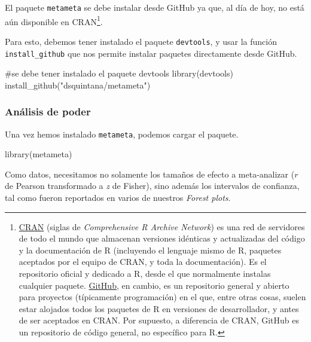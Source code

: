 \documentclass[
  bookmarksnumbered]{article}
\newenvironment{Shaded}{\begin{snugshade}}{\end{snugshade}}
\newcommand{\CommentTok}[1]{\textcolor[rgb]{0.54,0.53,0.53}{#1}}
\newcommand{\FunctionTok}[1]{\textcolor[rgb]{0.39,0.29,0.61}{#1}}
\newcommand{\NormalTok}[1]{\textcolor[rgb]{0.12,0.11,0.11}{#1}}
\newcommand{\StringTok}[1]{\textcolor[rgb]{0.75,0.01,0.01}{#1}}
\begin{document}
El paquete \texttt{metameta} se debe instalar desde GitHub ya que, al día de hoy, no está aún disponible en CRAN\footnote{\href{https://cran.r-project.org/}{CRAN} (siglas de \emph{Comprehensive R Archive Network}) es una red de servidores de todo el mundo que almacenan versiones idénticas y actualizadas del código y la documentación de R (incluyendo el lenguaje mismo de R, paquetes aceptados por el equipo de CRAN, y toda la documentación). Es el repositorio oficial y dedicado a R, desde el que normalmente instalas cualquier paquete. \href{https://github.com/}{GitHub}, en cambio, es un repositorio general y abierto para proyectos (típicamente programación) en el que, entre otras cosas, suelen estar alojados todos los paquetes de R en versiones de desarrollador, y antes de ser aceptados en CRAN. Por supuesto, a diferencia de CRAN, GitHub es un repositorio de código general, no específico para R.}.

Para esto, debemos tener instalado el paquete \texttt{devtools}, y usar la función \texttt{install\_github} que nos permite instalar paquetes directamente desde GitHub.

\begin{Shaded}
\begin{Highlighting}[]
\CommentTok{\#se debe tener instalado el paquete devtools}
\FunctionTok{library}\NormalTok{(devtools)}
\FunctionTok{install\_github}\NormalTok{(}\StringTok{"dsquintana/metameta"}\NormalTok{)}
\end{Highlighting}
\end{Shaded}

\hypertarget{anuxe1lisis-de-poder}{%
\subsubsection{Análisis de poder}\label{anuxe1lisis-de-poder}}

Una vez hemos instalado \texttt{metameta}, podemos cargar el paquete.

\begin{Shaded}
\begin{Highlighting}[]
\FunctionTok{library}\NormalTok{(metameta)}
\end{Highlighting}
\end{Shaded}

Como datos, necesitamos no solamente los tamaños de efecto a meta-analizar (\(r\) de Pearson transformado a \emph{z} de Fisher), sino además los intervalos de confianza, tal como fueron reportados en varios de nuestros \emph{Forest plots}.
\end{document}
